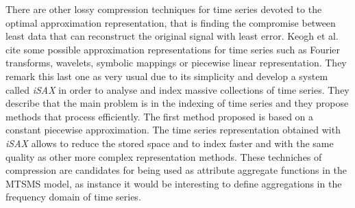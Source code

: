 There are other lossy compression techniques for time series devoted
to the optimal approximation representation, that is finding the
compromise between least data that can reconstruct the original signal
with least error. Keogh et al.\ \cite{keogh01} cite some possible
approximation representations for time series such as Fourier
transforms, wavelets, symbolic mappings or piecewise linear
representation. They remark this last one as very usual due to its
simplicity and develop a system called \emph{iSAX}
\cite{keogh08:isax,keogh10:isax} in order to analyse and index massive
collections of time series. They describe that the main problem is in
the indexing of time series and they propose methods that process
efficiently. The first method proposed is based on a constant
piecewise approximation. The time series representation obtained with
\emph{iSAX} allows to reduce the stored space and to index faster and
with the same quality as other more complex representation methods.
These techniches of compression are candidates for being used as
attribute aggregate functions in the MTSMS model, as instance it
would be interesting to define aggregations in the frequency domain of
time series.


 



 

